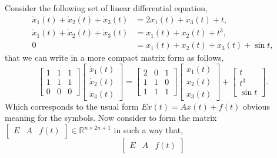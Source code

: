 		\begin{example}
			Consider the following set of linear differential equation, 
			\begin{subequations}
				\begin{align}
					\dot{x}_{1}(t) + \dot{x}_{2}(t) + \dot{x}_{3}(t) &= 2x_{1}(t) + x_{3}(t) + t, \\[0.25em]
					\dot{x}_{1}(t) + \dot{x}_{2}(t) + \dot{x}_{3}(t) &= x_{1}(t) + x_{2}(t) + t^{3}, \\[0.25em]
					0 &= x_{1}(t) + x_{2}(t) + x_{3}(t) + \sin{t},
				\end{align}
			\end{subequations}
			that we can write in a more compact matrix form as follows,
			\begin{equation}
				\begin{bmatrix}
					1 & 1 & 1 \\
					1 & 1 & 1 \\
					0 & 0 & 0
				\end{bmatrix}
				\begin{bmatrix}
					\dot{x}_{1}(t)\\
					\dot{x}_{2}(t)\\
					\dot{x}_{3}(t)
				\end{bmatrix}
				= 
				\begin{bmatrix}
					2 & 0 & 1\\
					1 & 1 & 0\\
					1 & 1 & 1
				\end{bmatrix}
				\begin{bmatrix}
					x_{1}(t) \\
					x_{2}(t) \\
					x_{3}(t)
				\end{bmatrix}
				+
				\begin{bmatrix}
					t \\
					t^3 \\
					\sin{t}
				\end{bmatrix}.
			\end{equation}
			Which corresponds to the usual form $E\dot{x}(t) = Ax(t) + f(t)$
			obvious meaning for the symbols.
			Now consider to form the matrix $\begin{bmatrix}E & A & 
			f(t) \end{bmatrix}\in\mathbb{R}^{n\times 2 n+1}$ in such a way that, 
			\begin{equation}
				\begin{bmatrix}
					E & A & f(t)
				\end{bmatrix}

\end{equation}
\end{example}
